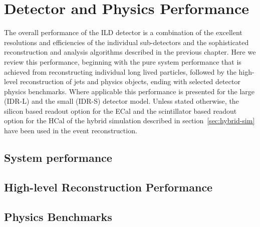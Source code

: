 \renewcommand{\fix}[1]{\textcolor{red}{\texttt{#1}}} %


\chapter{Detector and Physics Performance}
\label{chap:performance} 
\label{ild:sec:performance}
The overall performance of the ILD detector is a combination of the excellent
resolutions and efficiencies of the individual sub-detectors and the
sophisticated reconstruction and analysis algorithms described in the previous chapter.
Here we review this performance, beginning with the pure system performance that
is achieved from reconstructing individual long lived particles, followed by the high-level
reconstruction of jets and physics objects, ending with selected detector physics benchmarks.
Where applicable this performance is presented for the large (IDR-L) and the small (IDR-S)
detector model. Unless stated otherwise, the silicon based readout option for the ECal and the
scintillator based readout option for the HCal of the hybrid simulation described in section~\ref{sec:hybrid-sim}
have been used in the event reconstruction.

\section{\label{sec:system-performance} System performance}




\section{\label{sec:HLR-performance} High-level Reconstruction Performance}



\section{\label{sec:benchmarks} Physics Benchmarks}


